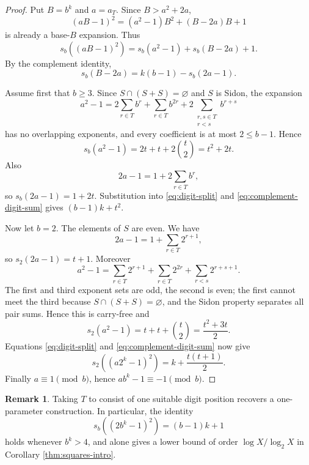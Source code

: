 \documentclass[11pt,reqno]{amsart}
\theoremstyle{plain}
\theoremstyle{definition}
\newtheorem{remark}[theorem]{Remark}
\newcommand{\1}{\mathbf 1}
\begin{document}
\begin{proof}
Put $B=b^k$ and $a=a_T$.  Since $B>a^2+2a$,
\begin{equation}\label{eq:ab-square-block}
 (aB-1)^2=(a^2-1)B^2+(B-2a)B+1
\end{equation}
is already a base-$B$ expansion.  Thus
\begin{equation}\label{eq:digit-split}
 s_b((aB-1)^2)=s_b(a^2-1)+s_b(B-2a)+1.
\end{equation}
By the complement identity,
\begin{equation}\label{eq:complement-digit-sum}
 s_b(B-2a)=k(b-1)-s_b(2a-1).
\end{equation}

Assume first that $b\ge3$.  Since $S\cap(S+S)=\varnothing$ and $S$ is Sidon, the expansion
\[
 a^2-1
 =2\sum_{r\in T}b^r+\sum_{r\in T}b^{2r}
   +2\sum_{\substack{r,s\in T\\r<s}}b^{r+s}
\]
has no overlapping exponents, and every coefficient is at most $2\le b-1$.  Hence
\[
 s_b(a^2-1)=2t+t+2\binom t2=t^2+2t.
\]
Also
\[
 2a-1=1+2\sum_{r\in T}b^r,
\]
so $s_b(2a-1)=1+2t$.  Substitution into \eqref{eq:digit-split} and \eqref{eq:complement-digit-sum} gives $(b-1)k+t^2$.

Now let $b=2$.  The elements of $S$ are even.  We have
\[
 2a-1=1+\sum_{r\in T}2^{r+1},
\]
so $s_2(2a-1)=t+1$.  Moreover
\[
 a^2-1=\sum_{r\in T}2^{r+1}+\sum_{r\in T}2^{2r}
       +\sum_{r<s}2^{r+s+1}.
\]
The first and third exponent sets are odd, the second is even; the first cannot meet the third because $S\cap(S+S)=\varnothing$, and the Sidon property separates all pair sums.  Hence this is carry-free and
\[
 s_2(a^2-1)=t+t+\binom t2=\frac{t^2+3t}{2}.
\]
Equations \eqref{eq:digit-split} and \eqref{eq:complement-digit-sum} now give
\[
 s_2((a2^k-1)^2)=k+\frac{t(t+1)}2.
\]
Finally $a\equiv1\pmod b$, hence $a b^k-1\equiv-1\pmod b$.
\end{proof}

\begin{remark}\label{rem:simple-square}
Taking $T$ to consist of one suitable digit position recovers a one-parameter construction.  In particular, the identity
\[
 s_b((2b^k-1)^2)=(b-1)k+1
\]
holds whenever $b^k>4$, and alone gives a lower bound of order $\log X/\log_2X$ in Corollary \ref{thm:squares-intro}.
\end{remark}
\end{document}
